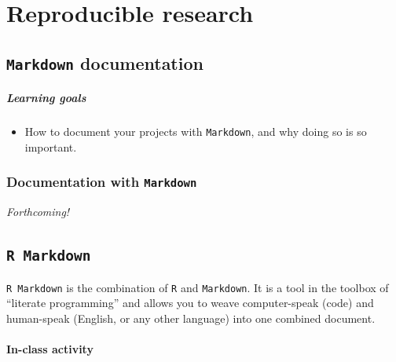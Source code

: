 \documentclass[
]{book}
\providecommand{\tightlist}{%
  \setlength{\itemsep}{0pt}\setlength{\parskip}{0pt}}
\begin{document}
\hypertarget{part-reproducible-research}{%
\part{Reproducible research}\label{part-reproducible-research}}

\hypertarget{markdown-documentation}{%
\chapter{\texorpdfstring{\texttt{Markdown} documentation}{Markdown documentation}}\label{markdown-documentation}}

\hypertarget{learning-goals-15}{%
\subsubsection*{Learning goals}\label{learning-goals-15}}

\begin{itemize}
\tightlist
\item
  How to document your projects with \texttt{Markdown}, and why doing so is so important.
\end{itemize}

\hypertarget{documentation-with-markdown}{%
\section*{\texorpdfstring{Documentation with \texttt{Markdown}}{Documentation with Markdown}}\label{documentation-with-markdown}}

\emph{Forthcoming!}

\hypertarget{r-markdown}{%
\chapter{\texorpdfstring{\texttt{R\ Markdown}}{R Markdown}}\label{r-markdown}}

\texttt{R\ Markdown} is the combination of \texttt{R} and \texttt{Markdown}. It is a tool in the toolbox of ``literate programming'' and allows you to weave computer-speak (code) and human-speak (English, or any other language) into one combined document.

\hypertarget{in-class-activity}{%
\subsection*{In-class activity}\label{in-class-activity}}
\end{document}
